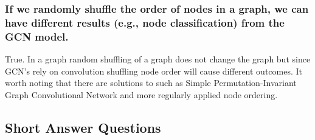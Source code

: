 \documentclass[11pt]{article}
\begin{document}
\subsubsection{If we randomly shuffle the order of nodes in a graph, we can have different results (e.g., node classification) from the GCN model.}
True. In a graph random shuffling of a graph does not change the graph but since GCN's rely on convolution shuffling node order will cause different outcomes. It worth noting that there are solutions to such as Simple Permutation-Invariant Graph
Convolutional Network and more regularly applied node ordering.
\subsection{Short Answer Questions}
\end{document}
